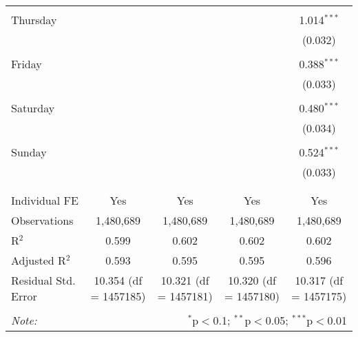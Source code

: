 \documentclass[
]{article}
\begin{document}
\begin{table}[!htbp]
{\begin{tabular}{@{\extracolsep{5pt}}lcccc}
  & & & & \\ 
 Thursday &  &  &  & 1.014$^{***}$ \\ 
  &  &  &  & (0.032) \\ 
  & & & & \\ 
 Friday &  &  &  & 0.388$^{***}$ \\ 
  &  &  &  & (0.033) \\ 
  & & & & \\ 
 Saturday &  &  &  & 0.480$^{***}$ \\ 
  &  &  &  & (0.034) \\ 
  & & & & \\ 
 Sunday &  &  &  & 0.524$^{***}$ \\ 
  &  &  &  & (0.033) \\ 
  & & & & \\ 
\hline \\[-1.8ex] 
Individual FE & Yes & Yes & Yes & Yes \\ 
Observations & 1,480,689 & 1,480,689 & 1,480,689 & 1,480,689 \\ 
R$^{2}$ & 0.599 & 0.602 & 0.602 & 0.602 \\ 
Adjusted R$^{2}$ & 0.593 & 0.595 & 0.595 & 0.596 \\ 
Residual Std. Error & 10.354 (df = 1457185) & 10.321 (df = 1457181) & 10.320 (df = 1457180) & 10.317 (df = 1457175) \\ 
\hline 
\hline \\[-1.8ex] 
\textit{Note:}  & \multicolumn{4}{r}{$^{*}$p$<$0.1; $^{**}$p$<$0.05; $^{***}$p$<$0.01} \\ 
\end{tabular}
} 
\end{table} 
\newpage
\end{document}
